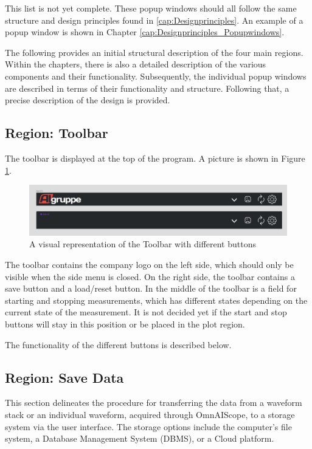 \documentclass[]{scrreprt}
\begin{document}
This list is not yet complete. These popup windows should all follow the same structure and design principles found in \ref{cap:Designprinciples}. 
An example of a popup window is shown in Chapter \ref{cap:Designprinciples_Popupwindows}.

The following provides an initial structural description of the four main regions. Within the chapters,
 there is also a detailed description of the various components and their functionality. Subsequently, 
the individual popup windows are described in terms of their functionality and structure. Following that, a precise description of the design is provided.


\subsection{Region: Toolbar}

The toolbar is displayed at the top of the program. A picture is shown in Figure \ref{fig:toolbar}.

\begin{figure}
    \includegraphics[width=.9\textwidth]{assets/pictures/Toolbar states.png}
    \caption[]{A visual representation of the Toolbar with different buttons}
    \label{fig:toolbar}
\end{figure}

The toolbar contains the company logo on the left side, which should only be visible when the side menu is closed. On the right side, the toolbar contains a save button and a load/reset button. In the middle of the toolbar is a field for starting and stopping measurements, which has different states depending on the current state of the measurement. It is not decided yet if the start and stop buttons will stay in this position or be placed in the plot region.

The functionality of the different buttons is described below.

\subsection{Region: Save Data}

This section delineates the procedure for transferring the data from a waveform stack or an individual waveform, 
acquired through OmnAIScope, to a storage system via the user interface. The storage options include the computer's file system, a Database Management System (DBMS), or a Cloud platform.
\end{document}
